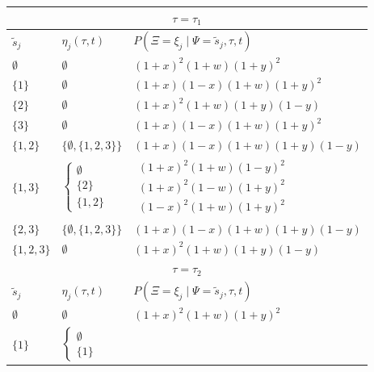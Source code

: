 \documentclass[a4paper]{article}
\newcommand{\siteSplit}{\tilde{s}}
\newcommand{\ancestralSplitPartition}{\eta}
\newcommand{\siteSplitRV}{\Psi}
\newcommand{\ancestralSplitRV}{\Xi}
\begin{document}
\begin{table}
\centering
\begin{tabular}{|l|ll|}
    \multicolumn{3}{c}{$\tau=\tau_1$}\\
    \hline
    $\siteSplit_j$    & $\ancestralSplitPartition_j(\tau, t)$ & $P(\ancestralSplitRV=\xi_j \mid \siteSplitRV=\siteSplit_j,\tau,t)$\\
    \hline
    $\emptyset$&
    $\emptyset$&
    $(1+x)^2   (1+w)(1+y)^2$\\
     $\{1\}$    &
    $\emptyset$&
    $(1+x)(1-x)(1+w)(1+y)^2$\\
     $\{2\}$    &
    $\emptyset$&
    $(1+x)^2   (1+w)(1+y)(1-y)$\\
     $\{3\}$    &
    $\emptyset$&
    $(1+x)(1-x)(1+w)(1+y)^2$\\
    $\{1,2\}$  &
    $\{\emptyset,\{1,2,3\}\}$&
    $(1+x)(1-x)(1+w)(1+y)(1-y)$\\
    $\{1,3\}$  &
    $\left\{\begin{array}{l}
                    \emptyset\\
                    \{2\}\\
                    \{1,2\}
                \end{array}\right.$&
    $\begin{array}{l}
                    (1+x)^2   (1+w)(1-y)^2\\
                    (1+x)^2   (1-w)(1+y)^2\\
                    (1-x)^2   (1+w)(1+y)^2
                \end{array}$\\
    $\{2,3\}$  &
                $\{\emptyset,\{1,2,3\}\}$&
                $(1+x)(1-x)(1+w)(1+y)(1-y)$\\
    $\{1,2,3\}$&
                $\emptyset$&
                $(1+x)^2   (1+w)(1+y)(1-y)$\\
    \hline
    \multicolumn{3}{c}{$\tau=\tau_2$}\\
    \hline
    $\siteSplit_j$    & $\ancestralSplitPartition_j(\tau, t)$ & $P(\ancestralSplitRV=\xi_j \mid \siteSplitRV=\siteSplit_j,\tau,t)$\\
    \hline
    $\emptyset$       &$\emptyset$&$(1+x)^2   (1+w)(1+y)^2$\\
    $\{1\}$          &
    $\left\{\begin{array}{l}
                    \emptyset\\
                    \{1\}
                \end{array}\right.$&

\end{tabular}
\end{table}
\end{document}

